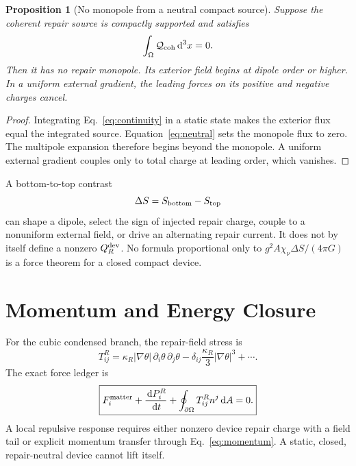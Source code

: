 \documentclass[11pt]{article}
\numberwithin{equation}{section}
\newtheorem{proposition}[theorem]{Proposition}
\theoremstyle{remark}
\newcommand{\chinu}{\chi_\nu}
\newcommand{\dd}{\,\mathrm d}
\begin{document}
\begin{proposition}[No monopole from a neutral compact source]
Suppose the coherent repair source is compactly supported and satisfies
\begin{equation}
\int_\Omega\mathcal Q_{\rm coh}\dd^3x=0.
\label{eq:neutral}
\end{equation}
Then it has no repair monopole. Its exterior field begins at dipole order or
higher. In a uniform external gradient, the leading forces on its positive and
negative charges cancel.
\end{proposition}

\begin{proof}
Integrating Eq.~\eqref{eq:continuity} in a static state makes the exterior
flux equal the integrated source. Equation~\eqref{eq:neutral} sets the
monopole flux to zero. The multipole expansion therefore begins beyond the
monopole. A uniform external gradient couples only to total charge at leading
order, which vanishes.
\end{proof}

A bottom-to-top contrast
\begin{equation}
\Delta S=S_{\rm bottom}-S_{\rm top}
\end{equation}
can shape a dipole, select the sign of injected repair charge, couple to a
nonuniform external field, or drive an alternating repair current. It does not
by itself define a nonzero \(Q_R^{\rm dev}\). No formula proportional only to
\(g^2A\chinu\Delta S/(4\pi G)\) is a force theorem for a closed compact
device.

\section{Momentum and Energy Closure}

For the cubic condensed branch, the repair-field stress is
\begin{equation}
T^R_{ij}=\kappa_R|\nabla\theta|\,
\partial_i\theta\,\partial_j\theta
-\delta_{ij}\frac{\kappa_R}{3}|\nabla\theta|^3+\cdots .
\label{eq:stress}
\end{equation}
The exact force ledger is
\begin{equation}
\boxed{
F_i^{\rm matter}+\frac{\dd P_i^R}{\dd t}
+\oint_{\partial\Omega}T^R_{ij}n^j\dd A=0.}
\label{eq:momentum}
\end{equation}
A local repulsive response requires either nonzero device repair charge with a
field tail or explicit momentum transfer through
Eq.~\eqref{eq:momentum}. A static, closed, repair-neutral device cannot lift
itself.
\end{document}
